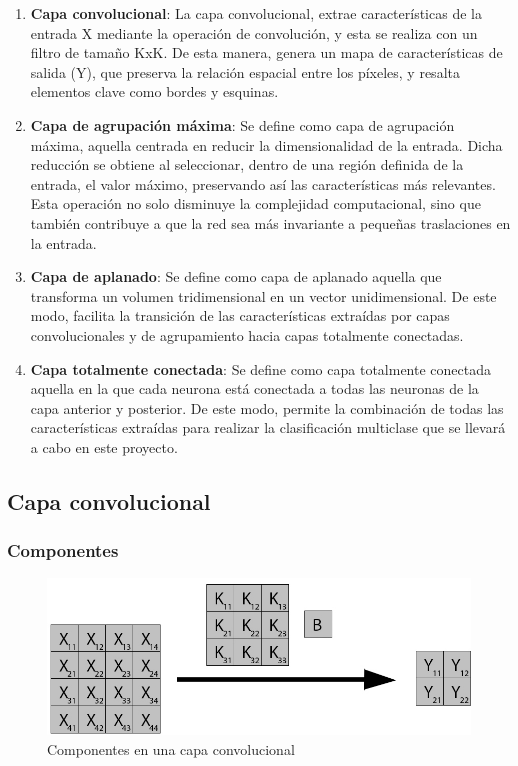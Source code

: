 \begin{enumerate}[label=\textbullet]
	\item \textbf{Capa convolucional}: La capa convolucional, extrae características de la entrada X mediante la operación de convolución, y esta se realiza con un filtro de tamaño KxK. De esta manera, genera un mapa de características de salida (Y), que preserva la relación espacial entre los píxeles, y resalta elementos clave como bordes y esquinas.
	\item \textbf{Capa de agrupación máxima}: Se define como capa de agrupación máxima, aquella centrada en reducir la dimensionalidad de la entrada. Dicha reducción se obtiene al seleccionar, dentro de una región definida de la entrada, el valor máximo, preservando así las características más relevantes. Esta operación no solo disminuye la complejidad computacional, sino que también contribuye a que la red sea más invariante a pequeñas traslaciones en la entrada.
	\item \textbf{Capa de aplanado}: Se define como capa de aplanado aquella que transforma un volumen tridimensional en un vector unidimensional. De este modo, facilita la transición de las características extraídas por capas convolucionales y de agrupamiento hacia capas totalmente conectadas.
	\item \textbf{Capa totalmente conectada}: Se define como capa totalmente conectada aquella en la que cada neurona está conectada a todas las neuronas de la capa anterior y posterior. De este modo, permite la combinación de todas las características extraídas para realizar la clasificación multiclase que se llevará a cabo en este proyecto.
\end{enumerate}

\subsection{Capa convolucional}

\subsubsection{Componentes}


\begin{figure}[H]
	\centering
	\includegraphics[scale=0.35]{imagenes/conv_nombres.jpg}  
	\caption{Componentes en una capa convolucional}
	\label{fig:Componentes_convolucion}
\end{figure}

